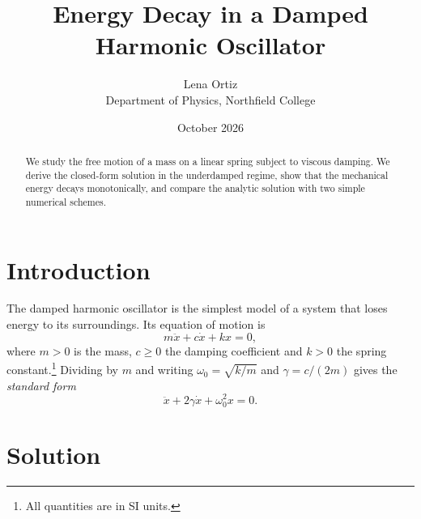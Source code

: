 \documentclass[11pt,a4paper]{article}
\title{Energy Decay in a Damped Harmonic Oscillator}
\author{Lena Ortiz\\ \small Department of Physics, Northfield College}
\date{October 2026}
\begin{document}
\maketitle

\begin{abstract}
We study the free motion of a mass on a linear spring subject to viscous damping. We derive the closed-form solution in the underdamped regime, show that the mechanical energy decays monotonically, and compare the analytic solution with two simple numerical schemes.
\end{abstract}

\section{Introduction}\label{sec:intro}

The damped harmonic oscillator is the simplest model of a system that loses energy to its surroundings\cite{ref2}. Its equation of motion is
\begin{equation}
  m\ddot{x}+c\dot{x}+kx=0,
  \label{eq:gauss}
\end{equation}
where $m>0$ is the mass, $c\geq0$ the damping coefficient and $k>0$ the spring constant.\footnote{All quantities are in SI units.} Dividing by $m$ and writing $\omega_{0}=\sqrt{k/m}$ and $\gamma=c/(2m)$ gives the \emph{standard form}
\begin{equation}
  \ddot{x}+2\gamma\dot{x}+\omega_{0}^{2}x=0.
  \label{eq:2}
\end{equation}

\section{Solution}
\end{document}
